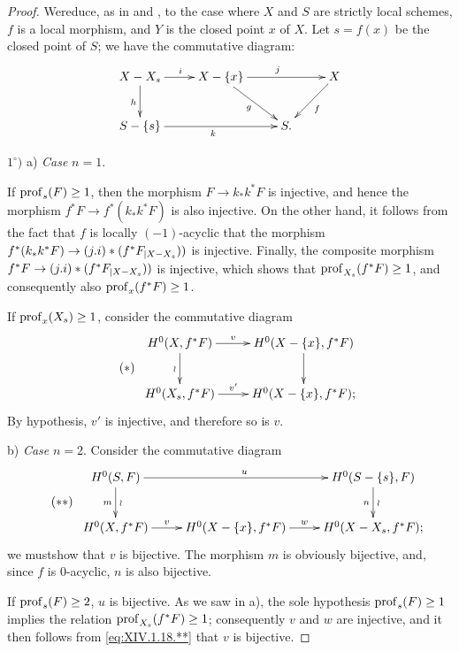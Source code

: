 \begin{proof}
We\pageoriginale reduce, as in  and , to the case where $X$ and $S$ are strictly local schemes, $f$ is a local morphism, and $Y$ is the closed point $x$ of $X$. Let $s=f(x)$ be the closed point of $S$; we have the commutative diagram:
$$
\xymatrix{ X-X_s\ar[r]^i\ar[d]_h&X-\{x\}\ar[rd]_g\ar[rr]^j&&X\ar[ld]^f\\
S-\{s\}\ar[rr]_k&&S. }$$

$1^\circ)$ a) \textit{Case} $n=1$.

If $\prof_s(F)\geq 1$, then the morphism $F\to k_*k^*F$ is injective, and hence the morphism $f^*F\to f^*(k_*k^*F)$ is also injective. On the other hand, it follows from the fact that $f$ is locally $(-1)$-acyclic that the morphism $f^*(k_*k^*F)\to (j.i)*(f^*\sisi{F{|X-X_s}}{F_{|X-X_s}}))$ is injective. Finally, the composite morphism $f^*F\to (j.i)*(f^*\sisi{F{|X-X_s}}{F_{|X-X_s}}))$ is injective, which shows that $\prof_{X_s}(f^*F)\geq 1$, and consequently also $\prof_x(f^*F)\geq 1$.

If $\prof_x(X_s)\geq 1$, consider the commutative diagram
\begin{equation*} \label{eq:XIV.18.*} \tag{$*$}
\begin{array}{c}
\xymatrix{
H^0(X, f^*F)\ar[r]^-{v}\ar[d]_\wr&H^0(X-\{x\}, f^*F)\ar[d]\\
H^0(X_s, f^*F)\ar[r]^-{v'}&H^0(X-\{x\}, f^*F);
}
\end{array}
\end{equation*}
By hypothesis, $v'$ is injective, and therefore so is $v$.

b) \textit{Case} $n=2$. Consider the commutative diagram
\begin{equation*} \label{eq:XIV.1.18.**} \tag{$**$}
\begin{array}{c}
\xymatrix{ H^0(S, F)\ar[d]_{m}^{\wr}\ar[rr]^u&&H^0(S-\{s\}, F)\ar[d]^{\wr}_{ n}\\
H^0(X, f^*F)\ar[r]^-v&H^0(X-\{x\}, f^*F)\ar[r]^w&H^0(X-X_s, f^*F);
}
\end{array}
\end{equation*}
we must\pageoriginaled show that $v$ is bijective. The morphism $m$ is obviously bijective, and, since $f$ is $0$-acyclic, $n$ is also bijective.

If $\prof_s(F)\geq 2$, $u$ is bijective. As we saw in a), the sole hypothesis $\prof_s(F)\geq 1$ implies the relation $\prof_{X_s}(f^*F)\geq 1$; consequently $v$ and $w$ are injective, and it then follows from \eqref{eq:XIV.1.18.**} that $v$ is bijective.


\end{proof}
